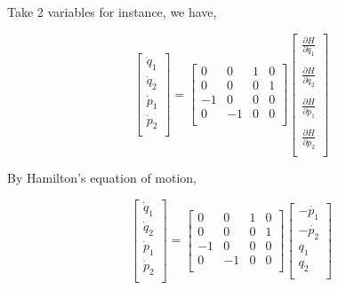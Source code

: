 \documentclass[12pt]{article}
\numberwithin{equation}{section}
\begin{document}
Take 2 variables for instance, we have,

\begin{center}
    \[ \begin{bmatrix}
        \dot{q}_1\\
        \dot{q}_2\\
        \dot{p}_1\\
        \dot{p}_2\\
    \end{bmatrix} = \begin{bmatrix}
        0 & 0 & 1 & 0\\
        0 & 0 & 0 & 1\\
        -1 & 0 & 0 & 0\\
        0 & -1 & 0 & 0\\
    \end{bmatrix} \begin{bmatrix}
        \frac{\partial H}{\partial q_1}\\\\
        \frac{\partial H}{\partial q_2}\\\\
        \frac{\partial H}{\partial p_1}\\\\
        \frac{\partial H}{\partial p_2}\\
    \end{bmatrix} \]
\end{center}

By Hamilton's equation of motion, 

\begin{center}
    \[ \begin{bmatrix}
        \dot{q}_1\\
        \dot{q}_2\\
        \dot{p}_1\\
        \dot{p}_2\\
    \end{bmatrix} = \begin{bmatrix}
        0 & 0 & 1 & 0\\
        0 & 0 & 0 & 1\\
        -1 & 0 & 0 & 0\\
        0 & -1 & 0 & 0\\
    \end{bmatrix} \begin{bmatrix}
        -\dot{p_1}\\
        -\dot{p_2}\\
        q_1\\
        q_2\\
    \end{bmatrix} \]
\end{center}
\end{document}
